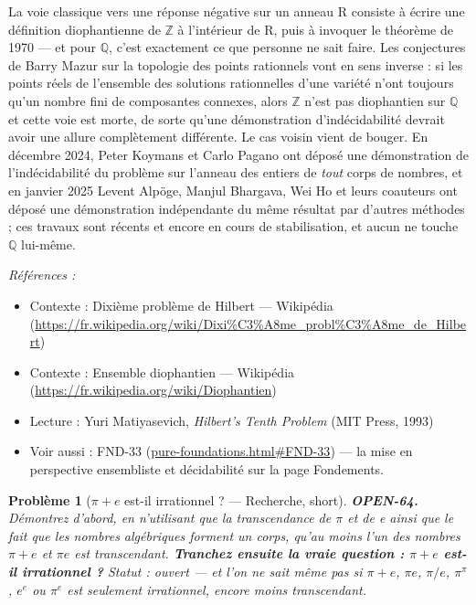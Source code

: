 \documentclass[11pt]{article}
\newtheorem{problem}{Problème}
\newenvironment{refs}{\par\small\noindent\emph{Références :}\begin{itemize}\setlength\itemsep{0pt}}{\end{itemize}\normalsize}
\begin{document}
\noindent La voie classique vers une réponse négative sur un anneau R consiste à
écrire une définition diophantienne de $\mathbb{Z}$ à l'intérieur de R, puis à invoquer le théorème de
1970 --- et pour $\mathbb{Q}$, c'est exactement ce que personne ne sait faire. Les conjectures de Barry
Mazur sur la topologie des points rationnels vont en sens inverse : si les points réels de
l'ensemble des solutions rationnelles d'une variété n'ont toujours qu'un nombre fini de
composantes connexes, alors $\mathbb{Z}$ n'est pas diophantien sur $\mathbb{Q}$ et cette voie est morte, de sorte
qu'une démonstration d'indécidabilité devrait avoir une allure complètement différente. Le
cas voisin vient de bouger. En décembre 2024, Peter Koymans et Carlo Pagano ont déposé une
démonstration de l'indécidabilité du problème sur l'anneau des entiers de \textit{tout} corps
de nombres, et en janvier 2025 Levent Alpöge, Manjul Bhargava, Wei Ho et leurs coauteurs
ont déposé une démonstration indépendante du même résultat par d'autres méthodes ; ces
travaux sont récents et encore en cours de stabilisation, et aucun ne touche $\mathbb{Q}$ lui-même.

\begin{refs}
\item Contexte : Dixième problème de Hilbert --- Wikipédia (\url{https://fr.wikipedia.org/wiki/Dixi%C3%A8me_probl%C3%A8me_de_Hilbert})
\item Contexte : Ensemble diophantien --- Wikipédia (\url{https://fr.wikipedia.org/wiki/Diophantien})
\item Lecture : Yuri Matiyasevich, \textit{Hilbert's Tenth Problem} (MIT Press, 1993)
\item Voir aussi : FND-33 (\url{pure-foundations.html#FND-33}) --- la mise en perspective ensembliste et décidabilité sur la page Fondements.
\end{refs}

\bigskip

\begin{problem}[{$ \pi + e $ est-il irrationnel ? --- Recherche, short}]
\textbf{OPEN-64.} Démontrez d'abord, en n'utilisant que la
transcendance de $\pi$ et de e ainsi que le fait que les nombres algébriques forment un corps,
qu'au moins l'un des nombres $ \pi + e $ et $ \pi e $ est transcendant. \textbf{Tranchez
ensuite la vraie question : $ \pi + e $ est-il irrationnel ?} Statut : ouvert --- et
l'on ne sait même pas si $ \pi + e $, $ \pi e $, $ \pi/e $, $ \pi^{\pi} $,
$ e^{e} $ ou $ \pi^{e} $ est seulement irrationnel, encore moins transcendant.
\end{problem}
\end{document}
